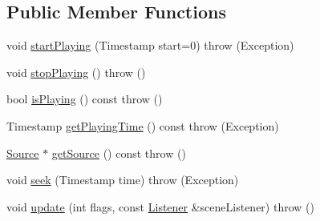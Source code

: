 \subsection*{Public Member Functions}
\begin{DoxyCompactItemize}
\item 
void \hyperlink{classAudio_1_1RenderableSource_a240346cb88970758bc877790f2b8545a}{start\+Playing} (Timestamp start=0)  throw (\+Exception)
\item 
void \hyperlink{classAudio_1_1RenderableSource_a2e55f6c7e2bc76dcf436ed3f6d70d63a}{stop\+Playing} ()  throw ()
\item 
bool \hyperlink{classAudio_1_1RenderableSource_aa5cd81e3f0c1813f7953c672dfccd06e}{is\+Playing} () const   throw ()
\item 
Timestamp \hyperlink{classAudio_1_1RenderableSource_a19535e76e6b9071531b8e84ffc491e40}{get\+Playing\+Time} () const   throw (\+Exception)
\item 
\hyperlink{classAudio_1_1Source}{Source} $\ast$ \hyperlink{classAudio_1_1RenderableSource_a3639436dd734341cc3a34c341d2b7347}{get\+Source} () const   throw ()
\item 
void \hyperlink{classAudio_1_1RenderableSource_a8a4cf54ee6297af0efe912cf7fa741a8}{seek} (Timestamp time)  throw (\+Exception)
\item 
void \hyperlink{classAudio_1_1RenderableSource_af3c5d37ca005ca87ce4ef123651d039b}{update} (int flags, const \hyperlink{classAudio_1_1Listener}{Listener} \&scene\+Listener)  throw ()
\end{DoxyCompactItemize}
